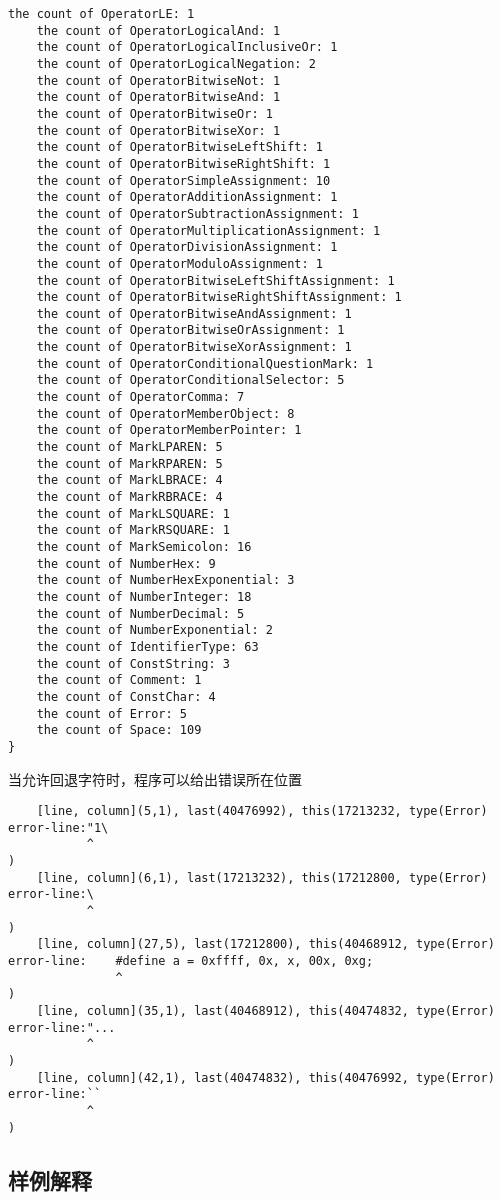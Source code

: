 \documentclass[UTF8]{ctexart}
\begin{document}
{\begin{lstlisting}[language={[ANSI]C++}]
    the count of OperatorLE: 1
    the count of OperatorLogicalAnd: 1
    the count of OperatorLogicalInclusiveOr: 1
    the count of OperatorLogicalNegation: 2
    the count of OperatorBitwiseNot: 1
    the count of OperatorBitwiseAnd: 1
    the count of OperatorBitwiseOr: 1
    the count of OperatorBitwiseXor: 1
    the count of OperatorBitwiseLeftShift: 1
    the count of OperatorBitwiseRightShift: 1
    the count of OperatorSimpleAssignment: 10
    the count of OperatorAdditionAssignment: 1
    the count of OperatorSubtractionAssignment: 1
    the count of OperatorMultiplicationAssignment: 1
    the count of OperatorDivisionAssignment: 1
    the count of OperatorModuloAssignment: 1
    the count of OperatorBitwiseLeftShiftAssignment: 1
    the count of OperatorBitwiseRightShiftAssignment: 1
    the count of OperatorBitwiseAndAssignment: 1
    the count of OperatorBitwiseOrAssignment: 1
    the count of OperatorBitwiseXorAssignment: 1
    the count of OperatorConditionalQuestionMark: 1
    the count of OperatorConditionalSelector: 5
    the count of OperatorComma: 7
    the count of OperatorMemberObject: 8
    the count of OperatorMemberPointer: 1
    the count of MarkLPAREN: 5
    the count of MarkRPAREN: 5
    the count of MarkLBRACE: 4
    the count of MarkRBRACE: 4
    the count of MarkLSQUARE: 1
    the count of MarkRSQUARE: 1
    the count of MarkSemicolon: 16
    the count of NumberHex: 9
    the count of NumberHexExponential: 3
    the count of NumberInteger: 18
    the count of NumberDecimal: 5
    the count of NumberExponential: 2
    the count of IdentifierType: 63
    the count of ConstString: 3
    the count of Comment: 1
    the count of ConstChar: 4
    the count of Error: 5
    the count of Space: 109
}
\end{lstlisting}
}
当允许回退字符时，程序可以给出错误所在位置
{\firacode
\begin{lstlisting}
    [line, column](5,1), last(40476992), this(17213232, type(Error)
error-line:"1\
           ^
)
    [line, column](6,1), last(17213232), this(17212800, type(Error)
error-line:\
           ^
)
    [line, column](27,5), last(17212800), this(40468912, type(Error)
error-line:    #define a = 0xffff, 0x, x, 00x, 0xg;
               ^
)
    [line, column](35,1), last(40468912), this(40474832, type(Error)
error-line:"...
           ^
)
    [line, column](42,1), last(40474832), this(40476992, type(Error)
error-line:``
           ^
)
\end{lstlisting}
}
\subsection{样例解释}
\end{document}
